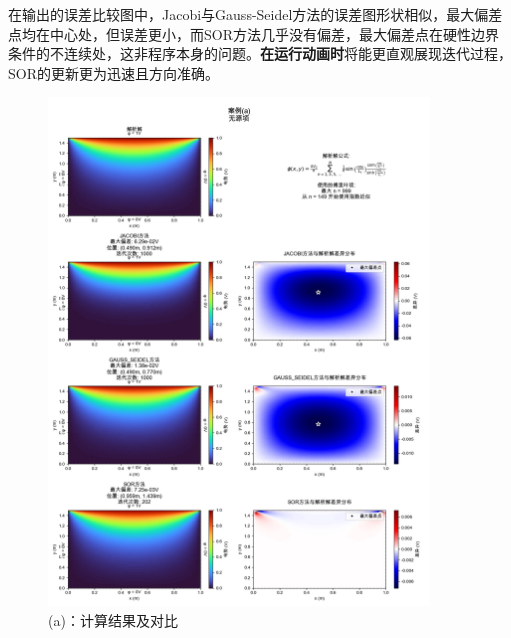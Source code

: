 在输出的误差比较图中，Jacobi与Gauss-Seidel方法的误差图形状相似，最大偏差点均在中心处，但误差更小，而SOR方法几乎没有偏差，最大偏差点在硬性边界条件的不连续处，这非程序本身的问题。\textbf{在运行动画时}将能更直观展现迭代过程，SOR的更新更为迅速且方向准确。
\begin{figure}[H]
    \centering
    \includegraphics[width=0.9\textwidth]{Problem_1/figs/a_result.png}
    \caption{(a)：计算结果及对比}
\end{figure}

